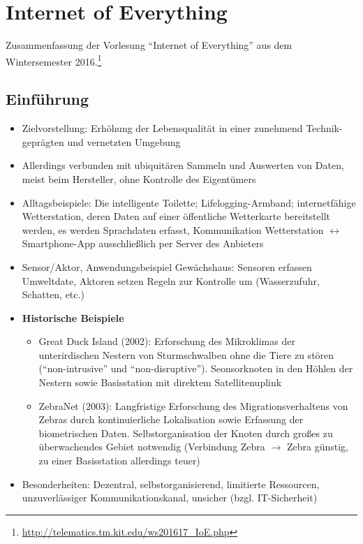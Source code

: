 \chapter{Internet of Everything}

Zusammenfassung der Vorlesung "`Internet of Everything"' aus dem Wintersemester 2016.\footnote{\url{http://telematics.tm.kit.edu/ws201617_IoE.php}}

\section{Einführung}
\begin{itemize}
	\item Zielvorstellung: Erhöhung der Lebensqualität in einer zunehmend Technik-geprägten und vernetzten Umgebung
	\item Allerdings verbunden mit ubiquitären Sammeln und Auswerten von Daten, meist beim Hersteller, ohne Kontrolle des Eigentümers
	\item Alltagsbeispiele: Die intelligente Toilette; Lifelogging-Armband; internetfähige Wetterstation, deren Daten auf einer öffentliche Wetterkarte bereitstellt werden, es werden Sprachdaten erfasst, Kommunikation Wetterstation \(\leftrightarrow\) Smartphone-App ausschließlich per Server des Anbieters
	\item Sensor/Aktor, Anwendungsbeispiel Gewächshaus: Sensoren erfassen Umweltdate, Aktoren setzen Regeln zur Kontrolle um (Wasserzufuhr, Schatten, etc.)
	\item \textbf{Historische Beispiele}
	\begin{itemize}
		\item Great Duck Island (2002): Erforschung des Mikroklimas der unterirdischen Nestern von Sturmschwalben ohne die Tiere zu stören ("`non-intrusive"' und "`non-disruptive"'). Seonsorknoten in den Höhlen der Nestern sowie Basisstation mit direktem Satellitenuplink
		\item ZebraNet (2003): Langfristige Erforschung des Migrationsverhaltens von Zebras durch kontinuierliche Lokalisation sowie Erfassung der biometrischen Daten. Selbstorganisation der Knoten durch großes zu überwachendes Gebiet notwendig (Verbindung Zebra \(\rightarrow\) Zebra günstig, zu einer Basisstation allerdings teuer)
	\end{itemize}
	\item Besonderheiten: Dezentral, selbstorganisierend, limitierte Ressourcen, unzuverlässiger Kommunikationskanal, unsicher (bzgl. IT-Sicherheit)
\end{itemize}



